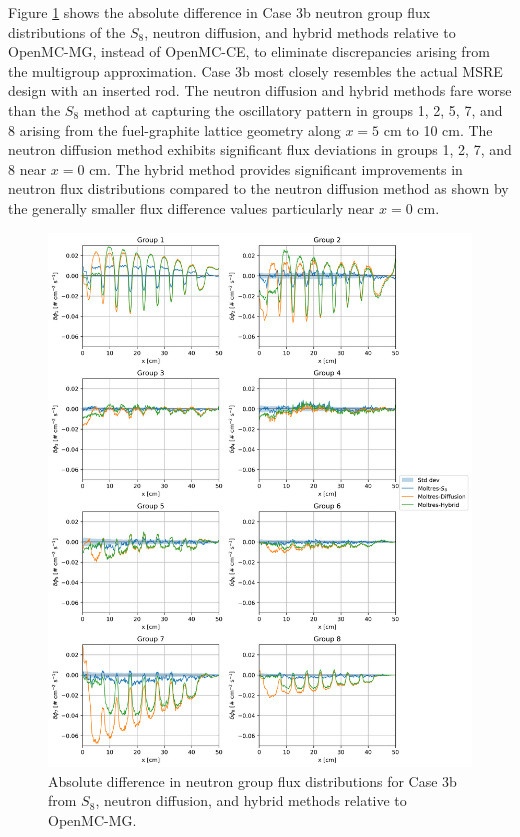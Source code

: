 \documentclass[letterpaper]{mc2025}
\begin{document}
Figure \ref{fig:3b-flux-diff} shows the absolute
difference in Case 3b neutron group flux distributions of the $S_8$, neutron diffusion, and
hybrid methods relative to OpenMC-MG, instead of OpenMC-CE, to eliminate discrepancies arising from
the multigroup approximation. Case 3b most closely resembles the actual \gls*{MSRE} design with an
inserted rod.
The neutron diffusion and hybrid methods fare worse than the $S_8$ method at capturing the
oscillatory pattern in groups 1, 2, 5, 7, and 8 arising from the fuel-graphite lattice geometry
along $x=5$ cm to 10 cm. The neutron diffusion method
exhibits significant flux deviations in groups 1, 2, 7, and 8 near $x=0$ cm. The hybrid method
provides significant improvements in neutron flux distributions compared to the neutron diffusion
method as shown by the generally smaller flux difference values particularly near $x=0$ cm.

\begin{figure}[htb!]
  \centering
  \includegraphics[width=\columnwidth]{case-3b-flux-diff}
  \caption{Absolute difference in neutron group flux distributions for Case 3b from $S_8$,
  neutron diffusion, and hybrid methods relative to OpenMC-MG.}
  \label{fig:3b-flux-diff}
\end{figure}
\end{document}
